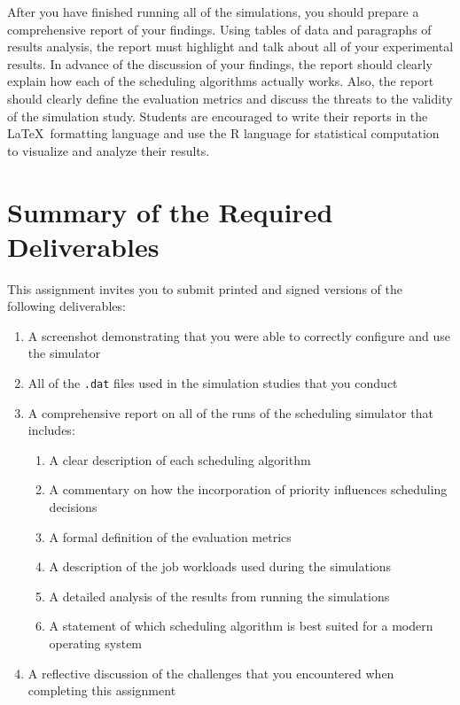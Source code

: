   After you have finished running all of the simulations, you should prepare a comprehensive report of your findings.
  Using tables of data and paragraphs of results analysis, the report must highlight and talk about all of your
  experimental results. In advance of the discussion of your findings, the report should clearly explain how each of the
  scheduling algorithms actually works. Also, the report should clearly define the evaluation metrics and discuss the
  threats to the validity of the simulation study. Students are encouraged to write their reports in the
  \LaTeX~formatting language and use the R language for statistical computation to visualize and analyze their results.

\section*{Summary of the Required Deliverables}

This assignment invites you to submit printed and signed versions of the following deliverables: 

\begin{enumerate}

  \itemsep0in

  \item A screenshot demonstrating that you were able to correctly configure and use the simulator

  \item All of the {\tt .dat} files used in the simulation studies that you conduct

  \item A comprehensive report on all of the runs of the scheduling simulator that includes:

  \begin{enumerate}

  \itemsep0in
    \item A clear description of each scheduling algorithm
    \item A commentary on how the incorporation of priority influences scheduling decisions
    \item A formal definition of the evaluation metrics
    \item A description of the job workloads used during the simulations
    \item A detailed analysis of the results from running the simulations
    \item A statement of which scheduling algorithm is best suited for a modern operating system

  \end{enumerate}

  \item A reflective discussion of the challenges that you encountered when completing this assignment

\end{enumerate}

